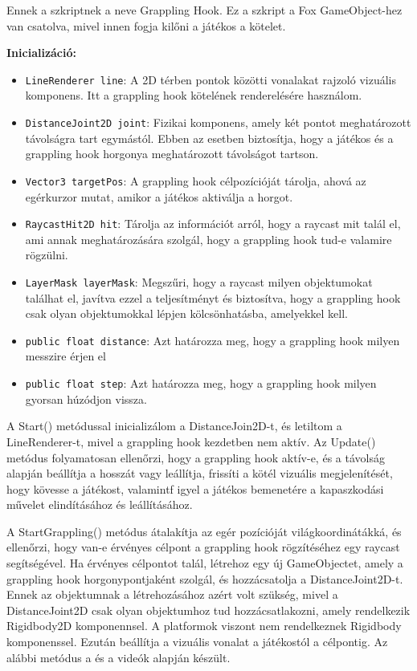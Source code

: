 Ennek a szkriptnek a neve Grappling Hook. Ez a szkript a Fox GameObject-hez van csatolva, mivel innen fogja kilőni a játékos a kötelet.

\textbf{Inicializáció:}
\begin{itemize}
\item \texttt{LineRenderer line}: A 2D térben pontok közötti vonalakat rajzoló vizuális komponens. Itt a grappling hook kötelének renderelésére használom.
\item \texttt{DistanceJoint2D joint}: Fizikai komponens, amely két pontot meghatározott távolságra tart egymástól. Ebben az esetben biztosítja, hogy a játékos és a grappling hook horgonya meghatározott távolságot tartson.
\item \texttt{Vector3 targetPos}: A grappling hook célpozícióját tárolja, ahová az egérkurzor mutat, amikor a játékos aktiválja a horgot.
\item \texttt{RaycastHit2D hit}: Tárolja az információt arról, hogy a raycast mit talál el, ami annak meghatározására szolgál, hogy a grappling hook tud-e valamire rögzülni.
\item \texttt{LayerMask layerMask}: Megszűri, hogy a raycast milyen objektumokat találhat el, javítva ezzel a teljesítményt és biztosítva, hogy a grappling hook csak olyan objektumokkal lépjen kölcsönhatásba, amelyekkel kell.
\item \texttt{public float distance}: Azt határozza meg, hogy a grappling hook milyen messzire érjen el
\item \texttt{public float step}: Azt határozza meg, hogy a grappling hook milyen gyorsan húzódjon vissza.
\end{itemize}

A Start() metódussal inicializálom a DistanceJoin2D-t, és letiltom a LineRenderer-t, mivel a grappling hook kezdetben nem aktív. Az Update() metódus folyamatosan ellenőrzi, hogy a grappling hook aktív-e, és a távolság alapján beállítja a hosszát vagy leállítja, frissíti a kötél vizuális megjelenítését, hogy kövesse a játékost, valamintf igyel a játékos bemenetére a kapaszkodási művelet elindításához és leállításához.

A StartGrappling() metódus átalakítja az egér pozícióját világkoordinátákká, és ellenőrzi, hogy van-e érvényes célpont a grappling hook rögzítéséhez egy raycast segítségével. Ha érvényes célpontot talál, létrehoz egy új GameObjectet, amely a grappling hook horgonypontjaként szolgál, és hozzácsatolja a DistanceJoint2D-t. Ennek az objektumnak a létrehozásához azért volt szükség, mivel a DistanceJoint2D csak olyan objektumhoz tud hozzácsatlakozni, amely rendelkezik Rigidbody2D komponennsel. A platformok viszont nem rendelkeznek Rigidbody komponenssel. Ezután beállítja a vizuális vonalat a játékostól a célpontig. Az alábbi metódus a \cite{grapplinghook1} és a \cite{grapplinghook2} videók alapján készült.


